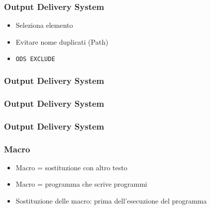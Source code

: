 \begin{frame}[containsverbatim]\frametitle{Output Delivery System}
  \begin{itemize}
  \item
    Seleziona elemento
  \item
    Evitare nome duplicati (Path)
  \item
    \verb+ODS EXCLUDE+
  \end{itemize}
\end{frame}

\begin{frame}[containsverbatim]\frametitle{Output Delivery System}
\end{frame}


\begin{frame}[containsverbatim]\frametitle{Output Delivery System}
\end{frame}


\begin{frame}[containsverbatim]\frametitle{Output Delivery System}
\end{frame}

\begin{comment}
  \begin{frame}[containsverbatim]\frametitle{Grafici}
    \VerbatimInput{code/grafici1.sas}
  \end{frame}

  \begin{frame}[containsverbatim]\frametitle{Grafici 2}
    \VerbatimInput{code/grafici2.sas}
  \end{frame}

  \begin{frame}[containsverbatim]\frametitle{Grafici e Proc Corr}
    \VerbatimInput{code/grafici3.sas}
  \end{frame}


  \begin{frame}[containsverbatim]\frametitle{Grafici e Proc Reg}
    \VerbatimInput{code/grafici4.sas}
  \end{frame}
\end{comment}





\begin{frame}\frametitle{Macro}
  \begin{itemize}
  \item
    Macro = sostituzione con altro testo
  \item
    Macro = programma che scrive programmi
  \item
    Sostituzione delle macro: prima dell'esecuzione del programma
  \end{itemize}
\end{frame}

